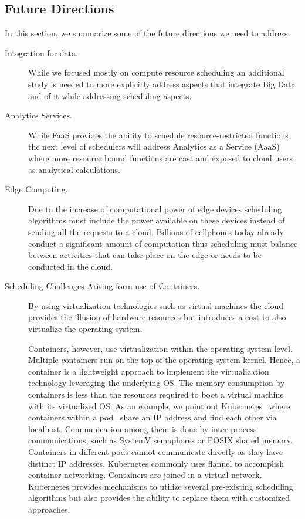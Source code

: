\documentclass[final,5p,times,twocolumn]{elsarticle}
\begin{document}
\subsection{Future Directions}

In this section, we summarize some of the future directions we need to address.

\begin{description}

\item[Integration for data.] While we focused mostly on compute resource scheduling an additional study is needed to more explicitly address aspects that integrate Big Data and of it while addressing scheduling aspects.

\item[Analytics Services.] While FaaS provides the ability to schedule resource-restricted functions the next level of schedulers will address Analytics as a Service (AaaS) where more resource bound functions are cast and exposed to cloud users as analytical calculations.
 
\item[Edge Computing.] Due to the increase of computational power of edge devices scheduling algorithms must include the power available on these devices instead of sending all the requests to a cloud. Billions of cellphones today already conduct a significant amount of computation thus scheduling must balance between activities that can take place on the edge or needs to be conducted in the cloud.

\item[Scheduling Challenges Arising form use of Containers.] By using virtualization technologies such as virtual machines the cloud provides the illusion of hardware resources but introduces a cost to also virtualize the operating system.

 Containers, however, use virtualization within the operating system level. Multiple containers run on the top of the operating system kernel. Hence, a container is a lightweight approach to implement the virtualization technology leveraging the underlying OS. The memory consumption by containers is less than the resources required to boot a virtual machine with its virtualized OS. As an example, we point out Kubernetes~\cite{Kuber2018} where containers within a pod~\cite{Kubernates2018} share an IP address and find each other via localhost. Communication among them is done by inter-process communications, such as SystemV semaphores or POSIX shared memory. Containers in different pods cannot communicate directly as they have distinct IP addresses. Kubernetes commonly uses flannel to accomplish container networking. Containers are joined in a virtual network. Kubernetes provides mechanisms to utilize several pre-existing scheduling algorithms but also provides the ability to replace them with customized approaches.


\end{description}
\end{document}
